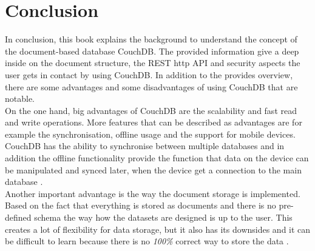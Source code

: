 \section{Conclusion}
In conclusion, this book explains the background to understand the concept of the document-based database CouchDB. The provided information give a deep inside on the document structure, the REST http API and security aspects the user gets in contact by using CouchDB.
In addition to the provides overview, there are some advantages and some disadvantages of using CouchDB that are notable.\\
\newline
On the one hand, big advantages of CouchDB are the scalability and fast read and write operations. 
More features that can be described as advantages are for example the synchronisation, offline usage and the support for mobile devices. CouchDB has the ability to synchronise between multiple databases and in addition the offline functionality provide the function that data on the device can be manipulated and synced later, when the device get a connection to the main database \parencite{MoronyJosh}. \\
%
Another important advantage is the way the document storage is implemented. Based on the fact that everything is stored as documents and there is no pre-defined schema the way how the datasets are designed is up to the user. This creates a lot of flexibility for data storage, but it also has its downsides and it can be difficult to learn because there is no \textit{100\%} correct way to store the data \parencite{MoronyJosh}. 
